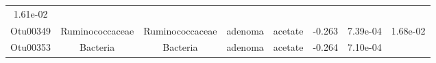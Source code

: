 \documentclass[11pt,]{article}
\begin{document}
\begin{longtable}[]{@{}cccccccc@{}}
\begin{minipage}[t]{0.08\columnwidth}
1.61e-02\strut
\end{minipage}\tabularnewline
\begin{minipage}[t]{0.08\columnwidth}\centering\strut
Otu00349\strut
\end{minipage} & \begin{minipage}[t]{0.15\columnwidth}\centering\strut
Ruminococcaceae\strut
\end{minipage} & \begin{minipage}[t]{0.15\columnwidth}\centering\strut
Ruminococcaceae\strut
\end{minipage} & \begin{minipage}[t]{0.08\columnwidth}\centering\strut
adenoma\strut
\end{minipage} & \begin{minipage}[t]{0.09\columnwidth}\centering\strut
acetate\strut
\end{minipage} & \begin{minipage}[t]{0.07\columnwidth}\centering\strut
-0.263\strut
\end{minipage} & \begin{minipage}[t]{0.08\columnwidth}\centering\strut
7.39e-04\strut
\end{minipage} & \begin{minipage}[t]{0.08\columnwidth}\centering\strut
1.68e-02\strut
\end{minipage}\tabularnewline
\begin{minipage}[t]{0.08\columnwidth}\centering\strut
Otu00353\strut
\end{minipage} & \begin{minipage}[t]{0.15\columnwidth}\centering\strut
Bacteria\strut
\end{minipage} & \begin{minipage}[t]{0.15\columnwidth}\centering\strut
Bacteria\strut
\end{minipage} & \begin{minipage}[t]{0.08\columnwidth}\centering\strut
adenoma\strut
\end{minipage} & \begin{minipage}[t]{0.09\columnwidth}\centering\strut
acetate\strut
\end{minipage} & \begin{minipage}[t]{0.07\columnwidth}\centering\strut
-0.264\strut
\end{minipage} & \begin{minipage}[t]{0.08\columnwidth}\centering\strut
7.10e-04\strut
\end{minipage} & \begin{minipage}[t]{0.08\columnwidth}\centering\strut

\end{minipage}
\end{longtable}
\end{document}
